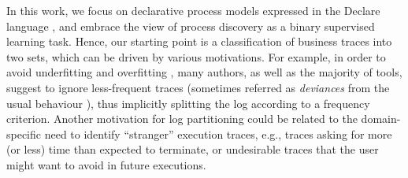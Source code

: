 In this work, we focus on declarative process models expressed in the Declare language \cite{2008-Pesic}, and embrace the view of process discovery as a binary supervised learning task. Hence, our starting point is a classification of business traces into two sets, which can be driven by various motivations.
For example, in order to avoid underfitting and overfitting \cite{2010-Aalst}, many authors, as well as the majority of tools, suggest to ignore less-frequent traces (sometimes referred as \emph{deviances} from the usual behaviour \cite{2016-Nguyen}), thus implicitly splitting the log according to a frequency criterion. Another motivation for log partitioning could be related to the domain-specific need to identify ``stranger'' execution traces, e.g., traces asking for more (or less) time than expected to terminate, or undesirable traces that the user might want to avoid in future executions.


